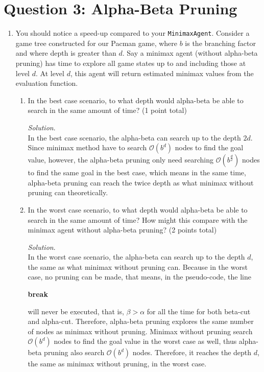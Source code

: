 \documentclass[10pt]{article}
\begin{document}
\section*{Question 3: Alpha-Beta Pruning}
\begin{enumerate}
    \item You should notice a speed-up compared to your \texttt{MinimaxAgent}. Consider a game tree constructed for our Pacman game, where $b$ is the branching factor and where depth is greater than $d$. Say a minimax agent (without alpha-beta pruning) has time to explore all game states up to and including those at level $d$. At level $d$, this agent will return estimated minimax values from the evaluation function.
    \begin{enumerate}
        \item In the best case scenario, to what depth would alpha-beta be able to search in the same amount of time? (1 point total)
        \begin{mdframed}[leftmargin=-6.5mm]
        \textit{Solution}.\\
        In the best case scenario, the alpha-beta can search up to the depth $2d$. Since minimax method have to search $\mathcal{O}(b^d)$ nodes to find the goal value, however, the alpha-beta pruning only need searching $\mathcal{O}(b^{\frac{d}{2}})$ nodes to find the same goal in the best case, which means in the same time, alpha-beta pruning can reach the twice depth as what minimax without pruning can theoretically.
        \end{mdframed}
        \item In the worst case scenario, to what depth would alpha-beta be able to search in the same amount of time? How might this compare with the minimax agent without alpha-beta pruning? (2 points total)
        \begin{mdframed}[leftmargin=-6.5mm]
        \textit{Solution}.\\
        In the worst case scenario, the alpha-beta can search up to the depth $d$, the same as what
        minimax without pruning can. Because in the worst case, no pruning can be made, that means, in the pseudo-code, the line
        \begin{algorithmic}
        \If {$\beta \leq \alpha$}
            \State \textbf{break}
        \EndIf
        \end{algorithmic}
        will never be executed, that is, $\beta > \alpha$ for all the time for both beta-cut and alpha-cut. Therefore, alpha-beta pruning explores the same number of nodes as minimax without pruning. Minimax without pruning search $\mathcal{O}(b^d)$ nodes to find the goal value in the worst case as well, thus alpha-beta pruning also search $\mathcal{O}(b^d)$ nodes. Therefore, it reaches the depth $d$, the same as minimax without pruning, in the worst case.

\end{mdframed}
\end{enumerate}
\end{enumerate}
\end{document}
